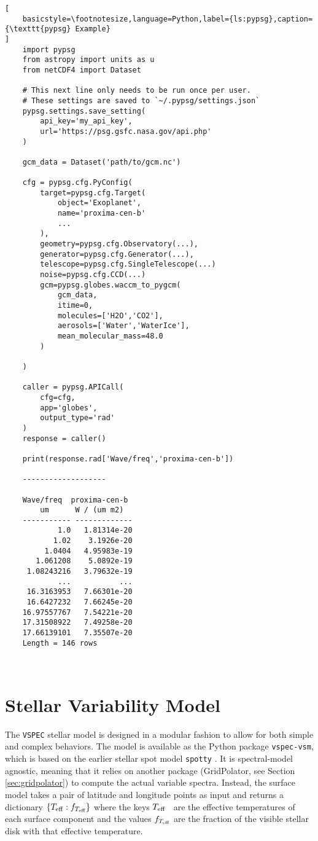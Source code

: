 \documentclass[twocolumn]{aastex631}
\newcommand{\teff}{$T_{\rm eff}$}
\newcommand{\vspec}[1]{\texttt{VSPEC}#1}
\begin{document}
\begin{lstlisting}[
    basicstyle=\footnotesize,language=Python,label={ls:pypsg},caption={\texttt{pypsg} Example}
]
    import pypsg
    from astropy import units as u
    from netCDF4 import Dataset

    # This next line only needs to be run once per user.
    # These settings are saved to `~/.pypsg/settings.json`
    pypsg.settings.save_setting(
        api_key='my_api_key',
        url='https://psg.gsfc.nasa.gov/api.php'
    )

    gcm_data = Dataset('path/to/gcm.nc')

    cfg = pypsg.cfg.PyConfig(
        target=pypsg.cfg.Target(
            object='Exoplanet',
            name='proxima-cen-b'
            ...
        ),
        geometry=pypsg.cfg.Observatory(...),
        generator=pypsg.cfg.Generator(...),
        telescope=pypsg.cfg.SingleTelescope(...)
        noise=pypsg.cfg.CCD(...)
        gcm=pypsg.globes.waccm_to_pygcm(
            gcm_data,
            itime=0,
            molecules=['H2O','CO2'],
            aerosols=['Water','WaterIce'],
            mean_molecular_mass=48.0
        )

    )

    caller = pypsg.APICall(
        cfg=cfg,
        app='globes',
        output_type='rad'
    )
    response = caller()

    print(response.rad['Wave/freq','proxima-cen-b'])

    -------------------

    Wave/freq  proxima-cen-b
        um      W / (um m2) 
    ----------- -------------
            1.0   1.81314e-20
           1.02    3.1926e-20
         1.0404   4.95983e-19
       1.061208    5.0892e-19
     1.08243216   3.79632e-19
            ...           ...
     16.3163953   7.66301e-20
     16.6427232   7.66245e-20
    16.97557767   7.54221e-20
    17.31508922   7.49258e-20
    17.66139101   7.35507e-20
    Length = 146 rows



\end{lstlisting}

\section{Stellar Variability Model}
\label{sec:star}

The \vspec{} stellar model is designed in a modular fashion to allow for both simple and complex behaviors. The model is available as the Python package \texttt{vspec-vsm}, which is based on the earlier stellar spot model \texttt{spotty} \citep{barclay2021}. It is spectral-model agnostic, meaning that it relies on another package (GridPolator, see Section \ref{sec:gridpolator}) to compute the actual variable spectra. Instead, the surface model takes a pair of latitude and longitude points as input and returns a dictionary $\{ T_{\rm eff} : f_{T_{\rm eff}} \}$ where the keys \teff~ are the effective temperatures of each surface component and the values $f_{T_{\rm eff}}$ are the fraction of the visible stellar disk with that effective temperature.
\end{document}
